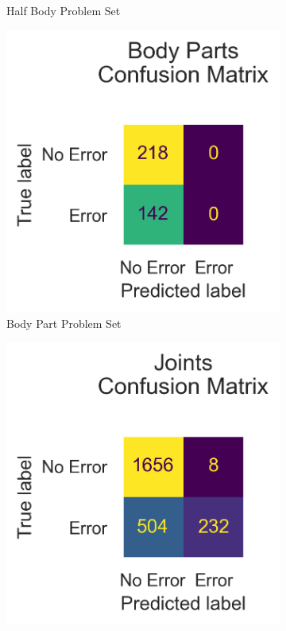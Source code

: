 \begin{figure}
\begin{subfigure}[b]{0.47\linewidth}
      \caption{Half Body Problem Set}
      \label{fig:hb_conf}
  \end{subfigure}
  \hfill
  \begin{subfigure}[b]{0.47\linewidth}
      \centering
      \includegraphics[width=\textwidth]{figures/Results/v2/confusion/body_parts_together.png}
      \caption{Body Part Problem Set}
      \label{fig:bp_conf}
  \end{subfigure}
  \hfill
  \begin{subfigure}[b]{0.47\linewidth}
      \centering
      \includegraphics[width=\textwidth]{figures/Results/v2/confusion/joints_together.png}

\end{subfigure}
\end{figure}
